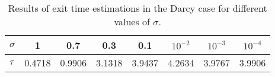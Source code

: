\begin{table}[H]
\centering
 	\begin{tabular}{lccccccc}
	\toprule
	$\sigma$ & 1 & 0.7 & 0.3 & 0.1 & $10^{-2}$ & $10^{-3}$ & $10^{-4}$ \\
	\midrule
	$\tau$ & 0.4718 & 0.9906 & 3.1318 & 3.9437 & 4.2634 & 3.9767 & 3.9906 \\
	\bottomrule
\end{tabular}
\caption{Results of exit time estimations in the Darcy case for different values of $\sigma$.}
\label{tab:MCofMC}
\end{table}




